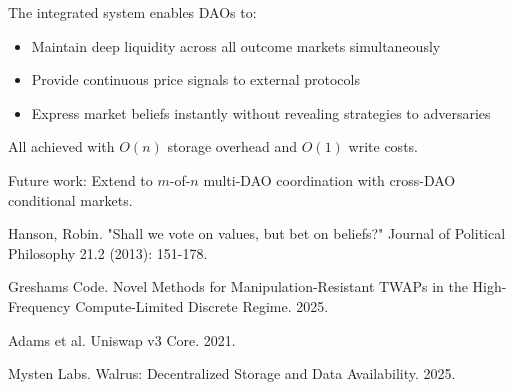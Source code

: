 \documentclass{article}
\begin{document}
The integrated system enables DAOs to:
\begin{itemize}
\item Maintain deep liquidity across all outcome markets simultaneously
\item Provide continuous price signals to external protocols
\item Express market beliefs instantly without revealing strategies to adversaries
\end{itemize}

All achieved with $O(n)$ storage overhead and $O(1)$ write costs.

Future work: Extend to $m$-of-$n$ multi-DAO coordination with cross-DAO conditional markets.

\begin{thebibliography}{9}
Hanson, Robin. "Shall we vote on values, but bet on beliefs?" Journal of Political Philosophy 21.2 (2013): 151-178.

Greshams Code. Novel Methods for Manipulation-Resistant TWAPs in the High-Frequency Compute-Limited Discrete Regime. 2025.

Adams et al. Uniswap v3 Core. 2021.

Mysten Labs. Walrus: Decentralized Storage and Data Availability. 2025.
\end{thebibliography}
\end{document}
